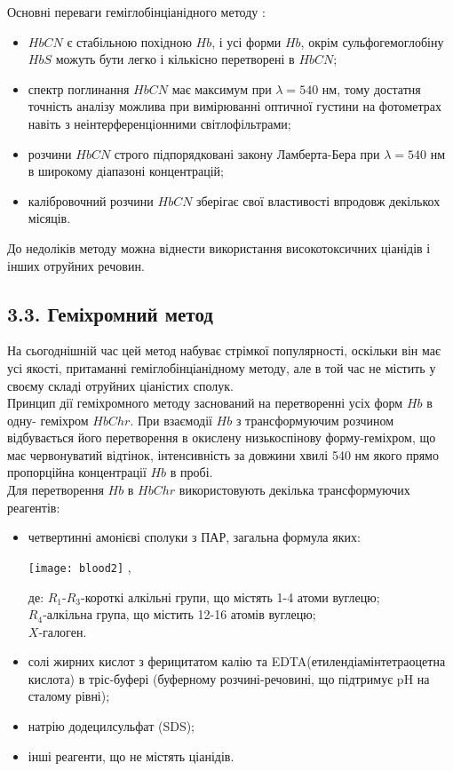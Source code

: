 \documentclass[14pt,a4paper]{scrartcl}
\begin{document}
Основні переваги геміглобінціанідного методу \cite{l1} :
\begin{itemize}
\item $HbCN$ є стабільною похідною $Hb$, і усі форми $Hb$, окрім сульфогемоглобіну $HbS$ можуть бути легко і кількісно перетворені в $HbCN$;
\item спектр поглинання  $HbCN$ має максимум при $\lambda=540$ нм, тому достатня точність аналізу можлива при вимірюванні оптичної густини на фотометрах навіть з неінтерференціонними світлофільтрами;
\item розчини $HbCN$ строго підпорядковані закону Ламберта-Бера при $\lambda=540$ нм в широкому діапазоні концентрацій;
\item калібровочний розчини $HbCN$ зберігає свої властивості впродовж декількох місяців.
\end{itemize}

До недоліків методу можна віднести використання високотоксичних ціанідів і інших отруйних речовин.
\newpage
\subsection*{3.3. Геміхромний метод}
На сьогоднішній час цей метод набуває стрімкої популярності, оскільки він має усі якості, притаманні геміглобінціанідному методу, але в той час не містить у своєму складі отруйних ціаністих сполук.\\

Принцип дії геміхромного методу заснований на перетворенні усіх форм $Hb$ в одну- геміхром $HbChr$. \cite{l1} При взаємодії $Hb$ з трансформуючим розчином відбувається його перетворення в окислену низькоспінову форму-геміхром, що має червонуватий відтінок, інтенсивність за довжини хвилі 540 нм якого прямо пропорційна концентрації $Hb$ в пробі.\\

Для перетворення $Hb$ в $HbChr$ використовують декілька трансформуючих реагентів:
\begin{itemize}
\item четвертинні амонієві сполуки з ПАР, загальна формула яких:
\begin{center}
\texttt{[image: blood2]} \cite{l1},
\end{center}
де: $R_1$-$R_3$-короткі алкільні групи, що містять 1-4 атоми вуглецю;\\[0.1 cm]
$R_4$-алкільна група, що містить 12-16 атомів вуглецю;\\[0.1 cm]
$X$-галоген.\\[0.3 cm]
\item солі жирних кислот з ферицитатом калію та EDTA(етилендіамінтетраоцетна кислота) в тріс-буфері (буферному розчині-речовині, що підтримує pH на сталому рівні);
\item натрію додецилсульфат (SDS);
\item інші реагенти, що не містять ціанідів.\\
\end{itemize}
\end{document}
